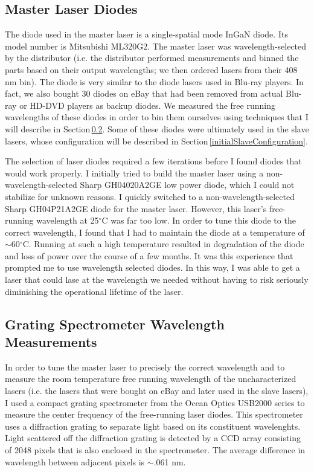 \subsection{Master Laser Diodes}
\label{masterLaserDiodes}
The diode used in the master laser is a single-spatial mode InGaN diode. Its model number is Mitsubishi ML320G2. The master laser was wavelength-selected by the distributor (i.e. the distributor performed measurements and binned the parts based on their output wavelengths; we then ordered lasers from their 408 nm bin). The diode is very similar to the diode lasers used in Blu-ray players. 
In fact, we also bought 30 diodes on eBay that had been removed from actual Blu-ray or HD-DVD players as backup diodes. We measured the free running wavelengths of these diodes in order to bin them ourselves using techniques that I will describe in Section\,\ref{gratingSpectrometerWavelengthMeasurements}. Some of these diodes were ultimately used in the slave lasers, whose configuration will be described in Section\,\ref{initialSlaveConfiguration}.



The selection of laser diodes required a few iterations before I found diodes that would work properly. I initially tried to build the master laser using a non-wavelength-selected Sharp GH04020A2GE low power diode, which I could not stabilize for unknown reasons. I quickly switched to a non-wavelength-selected Sharp GH04P21A2GE diode for the master laser. However, this laser's free-running wavelength at 25$^\circ$C was far too low. In order to tune this diode to the correct wavelength, I found that I had to maintain the diode at a temperature of $\sim$60$^\circ$C. Running at such a high temperature resulted in degradation of the diode and loss of power over the course of a few months. It was this experience that prompted me to use wavelength selected diodes. In this way, I was able to get a laser that could lase at the wavelength we needed without having to risk seriously diminishing the operational lifetime of the laser.

\subsection{Grating Spectrometer Wavelength Measurements}
\label{gratingSpectrometerWavelengthMeasurements}
In order to tune the master laser to precisely the correct wavelength and to measure the room temperature free running wavelength of the uncharacterized lasers (i.e. the lasers that were bought on eBay and later used in the slave lasers), I used a compact grating spectrometer from the Ocean Optics USB2000 series to measure the center frequency of the free-running laser diodes. This spectrometer uses a diffraction grating to separate light based on its constituent wavelenghts. Light scattered off the diffraction grating is detected by a CCD array consisting of 2048 pixels that is also enclosed in the spectrometer. The average difference in wavelength between adjacent pixels is $\sim$.061 nm. %

